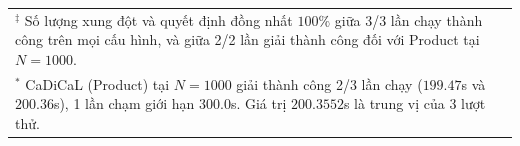 \begin{table}[htbp]
{\begin{tabular}{llr rrrr rrrr}
\bottomrule
\multicolumn{11}{l}{\footnotesize $^\ddagger$ Số lượng xung đột và quyết định đồng nhất $100\%$ giữa 3/3 lần chạy thành công trên mọi cấu hình, và giữa 2/2 lần giải thành công đối với Product tại $N=1000$.} \\
\multicolumn{11}{l}{\footnotesize $^*$ CaDiCaL (Product) tại $N=1000$ giải thành công 2/3 lần chạy ($199.47$s và $200.36$s), 1 lần chạm giới hạn 300.0s. Giá trị $200.3552$s là trung vị của 3 lượt thử.} \\
\end{tabular}%
}
\end{table}